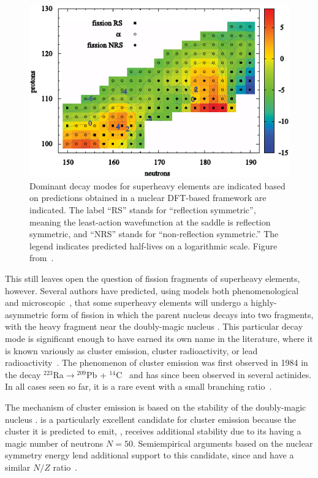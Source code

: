 \begin{figure}
	\centering
	\includegraphics[width=0.7\linewidth]{TeX_files/294Og_Warda2012_SHE}
	\caption{Dominant decay modes for superheavy elements are indicated based on predictions obtained in a nuclear DFT-based framework are indicated. The label ``RS'' stands for ``reflection symmetric'', meaning the least-action wavefunction at the saddle is reflection symmetric, and ``NRS'' stands for ``non-reflection symmetric.'' The legend indicates predicted half-lives on a logarithmic scale. Figure from~\cite{Warda2012}.}
	\label{fig:warda2012she}
\end{figure}

This still leaves open the question of fission fragments of superheavy elements, however. Several authors have predicted, using models both phenomenological~\cite{Poenaru2011, Poenaru2012, Poenaru2013, Poenaru2015, Poenaru2018,Santhosh2018, Zhang2018} and microscopic~\cite{Warda2018}, that some superheavy elements will undergo a highly-asymmetric form of fission in which the parent nucleus decays into two fragments, with the heavy fragment near the doubly-magic nucleus {\Pb}. This particular decay mode is significant enough to have earned its own name in the literature, where it is known variously as cluster emission, cluster radioactivity, or lead radioactivity~\cite{Sandulescu1980,Poenaru1986,Royer1998,Poenaru2010,Warda2011}. The phenomenon of cluster emission was first observed in 1984 in the decay $^{223}$Ra$\rightarrow$$^{209}$Pb + $^{14}$C~\cite{Rose1984} and has since been observed in several actinides. In all cases seen so far, it is a rare event with a small branching ratio~\cite{Poenaru2010}.

The mechanism of cluster emission is based on the stability of the doubly-magic nucleus {\Pb}. {\Og} is a particularly excellent candidate for cluster emission because the cluster it is predicted to emit, {\Kr}, receives additional stability due to its having a magic number of neutrons $N=50$.  Semiempirical arguments based on the nuclear symmetry energy lend additional support to this candidate, since {\Og} and {\Pb} have a similar $N/Z$ ratio~\cite{Warda2018}.

